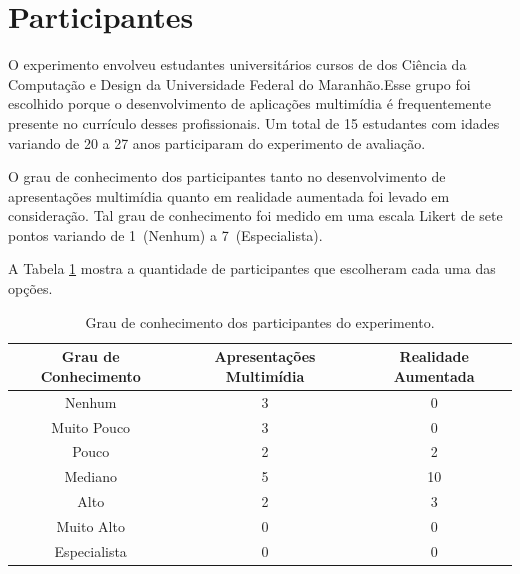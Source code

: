 \documentclass[../main.tex]{subfiles}
\begin{document}
\section{Participantes}
\label{sec:participantes}

O experimento envolveu estudantes universitários cursos de dos Ciência da Computação e Design da Universidade Federal do Maranhão.Esse grupo foi escolhido porque o desenvolvimento de aplicações multimídia é frequentemente presente no currículo desses profissionais. Um total de 15 estudantes com idades variando de 20 a 27 anos participaram do experimento de avaliação.

O grau de conhecimento dos participantes tanto no desenvolvimento de apresentações multimídia quanto em realidade aumentada foi levado em consideração. Tal grau de conhecimento foi medido em uma escala Likert de sete pontos variando de 1~(Nenhum) a 7~(Especialista).

A Tabela \ref{tab:expParticipantes} mostra a quantidade de participantes que escolheram cada uma das opções.

\begin{table}[ht!]
\caption{Grau de conhecimento dos participantes do experimento.}
\label{tab:expParticipantes}

\begin{tabular}{@{}ccc@{}}
\toprule
\textbf{Grau de Conhecimento} & \textbf{Apresentações Multimídia} & \textbf{Realidade Aumentada} \\ \midrule
Nenhum                        & 3                                 & 0                            \\
Muito Pouco                   & 3                                 & 0                            \\
Pouco                         & 2                                 & 2                            \\
Mediano                       & 5                                 & 10                           \\
Alto                          & 2                                 & 3                            \\
Muito Alto                    & 0                                 & 0                            \\
Especialista                  & 0                                 & 0                            \\ \bottomrule
\end{tabular}
\end{table}
\end{document}
